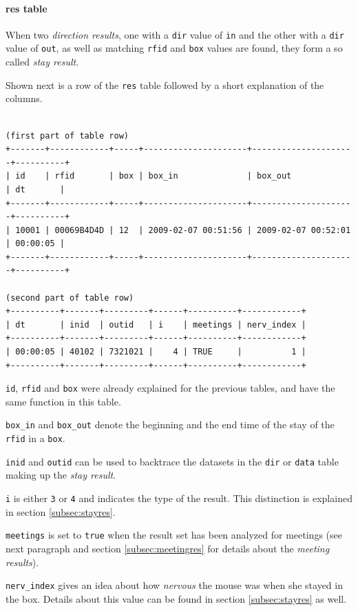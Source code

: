 \paragraph{res table}
\label{para:res_table}

When two \textit{direction results}, one with a \lstinline|dir| value of \lstinline|in| and the other with a \lstinline|dir| value of \lstinline|out|, as well as matching \lstinline|rfid| and \lstinline|box| values are found, they form a so called \textit{stay result}.

Shown next is a row of the \lstinline|res| table followed by a short explanation of the columns.

\codescript
{}
\begin{lstlisting}[frame=none]

(first part of table row)
+-------+------------+-----+---------------------+---------------------+----------+
| id    | rfid       | box | box_in              | box_out             | dt       |
+-------+------------+-----+---------------------+---------------------+----------+
| 10001 | 00069B4D4D | 12  | 2009-02-07 00:51:56 | 2009-02-07 00:52:01 | 00:00:05 |
+-------+------------+-----+---------------------+---------------------+----------+

(second part of table row)
+----------+-------+---------+------+----------+------------+
| dt       | inid  | outid   | i    | meetings | nerv_index |
+----------+-------+---------+------+----------+------------+
| 00:00:05 | 40102 | 7321021 |    4 | TRUE     |          1 | 
+----------+-------+---------+------+----------+------------+

\end{lstlisting}

\begin{mydesc}
	\item \lstinline|id|, \lstinline|rfid| and \lstinline|box| were already explained for the previous tables, and have the same function in this table.
	\item \lstinline|box_in| and \lstinline|box_out| denote the beginning and the end time of the stay of the \lstinline|rfid| in a \lstinline|box|.
	 \item \lstinline|inid| and \lstinline|outid| can be used to backtrace the datasets in the \lstinline|dir| or \lstinline|data| table making up the \textit{stay result}.
	 \item \lstinline|i| is either \lstinline|3| or \lstinline|4| and indicates the type of the result. This distinction is explained in section \ref{subsec:stayres}.
	 \item \lstinline|meetings| is set to \lstinline|true| when the result set has been analyzed for meetings (see next paragraph and section \ref{subsec:meetingres} for details about the \textit{meeting results}).
	 \item \lstinline|nerv_index| gives an idea about how \textit{nervous} the mouse was when she stayed in the box. Details about this value can be found in section \ref{subsec:stayres} as well.
\end{mydesc}

